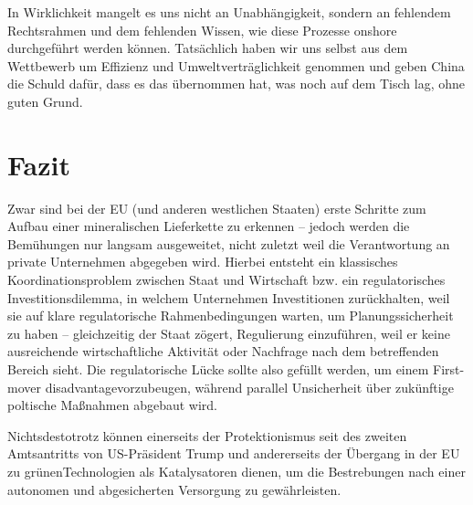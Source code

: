 \documentclass[12pt,a4paper,oneside]{book} %
\begin{document}
In Wirklichkeit mangelt es uns nicht an Unabhängigkeit, sondern an fehlendem Rechtsrahmen und dem fehlenden Wissen, wie diese Prozesse onshore durchgeführt werden können. Tatsächlich haben wir uns selbst aus dem Wettbewerb um Effizienz und Umweltverträglichkeit genommen und geben China die Schuld dafür, dass es das übernommen hat, was noch auf dem Tisch lag, ohne guten Grund.

\section{Fazit}
Zwar sind bei der EU (und anderen westlichen Staaten) erste Schritte zum Aufbau einer mineralischen Lieferkette zu erkennen -- jedoch werden die Bemühungen nur langsam ausgeweitet, nicht zuletzt weil die Verantwortung an private Unternehmen abgegeben wird. Hierbei entsteht ein klassisches Koordinationsproblem zwischen Staat und Wirtschaft bzw. ein \glqq regulatorisches Investitionsdilemma\grqq, in welchem Unternehmen Investitionen zurückhalten, weil sie auf klare regulatorische Rahmenbedingungen warten, um Planungssicherheit zu haben -- gleichzeitig der Staat zögert, Regulierung einzuführen, weil er keine ausreichende wirtschaftliche Aktivität oder Nachfrage nach dem betreffenden Bereich sieht. Die regulatorische Lücke sollte also gefüllt werden, um einem \glqq First-mover disadvantage\grqq vorzubeugen, während parallel Unsicherheit über zukünftige poltische Maßnahmen abgebaut wird.

Nichtsdestotrotz können einerseits der Protektionismus seit des zweiten Amtsantritts von US-Präsident Trump und andererseits der Übergang in der EU zu \glqq grünen\grqq Technologien als Katalysatoren dienen, um die Bestrebungen nach einer autonomen und abgesicherten Versorgung zu gewährleisten.


\printbibliography 
\end{document}
